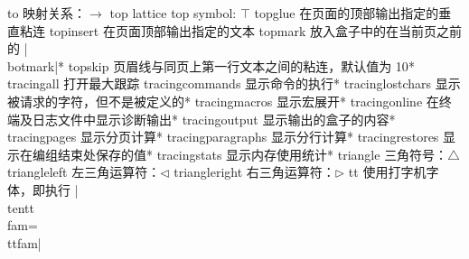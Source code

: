 \capcs to {映射关系：$\to$}{}{}
\capcs top {lattice top symbol: $\top$}{}{}
\capcs topglue {在页面的顶部输出指定的垂直粘连}{}{}
\capcs topinsert {在页面顶部输出指定的文本}{}{}
\capcs topmark {放入盒子中的在当前页之前的 |\\botmark|}*{}
\capcs topskip {页眉线与同页上第一行文本之间的粘连，默认值为 10\pt}*{}
\capcs tracingall {打开最大跟踪}{}{}
\capcs tracingcommands {显示命令的执行}*{}
\capcs tracinglostchars {显示被请求的字符，但不是被定义的}*{}
\capcs tracingmacros {显示宏展开}*{}
\capcs tracingonline {在终端及日志文件中显示诊断输出}*{}
\capcs tracingoutput {显示输出的盒子的内容}*{}
\capcs tracingpages {显示分页计算}*{}
\capcs tracingparagraphs {显示分行计算}*{}
\capcs tracingrestores {显示在编组结束处保存的值}*{}
\capcs tracingstats {显示内存使用统计}*{}
\capcs triangle {三角符号：$\triangle$}{}{}
\capcs triangleleft {左三角运算符：$\triangleleft$}{}{}
\capcs triangleright {右三角运算符：$\triangleright$}{}{}
\capcs tt {使用打字机字体，即执行 |\\tentt\\fam=\\ttfam|}{}{}

